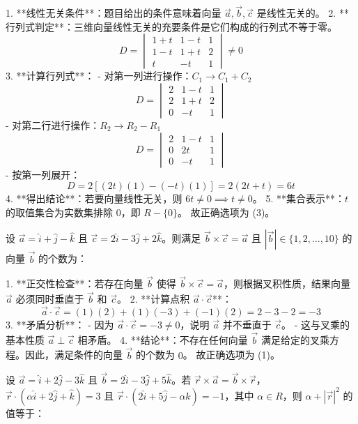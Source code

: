 \begin{questions}
\begin{solution}
1. **线性无关条件**：题目给出的条件意味着向量 $\vec{a}, \vec{b}, \vec{c}$ 是线性无关的。
2. **行列式判定**：三维向量线性无关的充要条件是它们构成的行列式不等于零。
\[
D = \begin{vmatrix} 1+t & 1-t & 1 \\ 1-t & 1+t & 2 \\ t & -t & 1 \end{vmatrix} \neq 0
\]
3. **计算行列式**：
   - 对第一列进行操作：$C_1 \to C_1 + C_2$
\[
D = \begin{vmatrix} 2 & 1-t & 1 \\ 2 & 1+t & 2 \\ 0 & -t & 1 \end{vmatrix}
\]
   - 对第二行进行操作：$R_2 \to R_2 - R_1$
\[
D = \begin{vmatrix} 2 & 1-t & 1 \\ 0 & 2t & 1 \\ 0 & -t & 1 \end{vmatrix}
\]
   - 按第一列展开：
\[
D = 2 [ (2t)(1) - (-t)(1) ] = 2(2t + t) = 6t
\]
4. **得出结论**：若要向量线性无关，则 $6t \neq 0 \implies t \neq 0$。
5. **集合表示**：$t$ 的取值集合为实数集排除 $0$，即 $R - \{0\}$。
故正确选项为 (3)。
\end{solution}

\question
设 $\vec{a} = \hat{i} + \hat{j} - \hat{k}$ 且 $\vec{c} = 2\hat{i} - 3\hat{j} + 2\hat{k}$。则满足 $\vec{b} \times \vec{c} = \vec{a}$ 且 $|\vec{b}| \in \{1, 2, \dots, 10\}$ 的向量 $\vec{b}$ 的个数为：

\begin{solution}
1. **正交性检查**：若存在向量 $\vec{b}$ 使得 $\vec{b} \times \vec{c} = \vec{a}$，则根据叉积性质，结果向量 $\vec{a}$ 必须同时垂直于 $\vec{b}$ 和 $\vec{c}$。
2. **计算点积 $\vec{a} \cdot \vec{c}$**：
\[
\vec{a} \cdot \vec{c} = (1)(2) + (1)(-3) + (-1)(2) = 2 - 3 - 2 = -3
\]
3. **矛盾分析**：
   - 因为 $\vec{a} \cdot \vec{c} = -3 \neq 0$，说明 $\vec{a}$ 并不垂直于 $\vec{c}$。
   - 这与叉乘的基本性质 $\vec{a} \perp \vec{c}$ 相矛盾。
4. **结论**：不存在任何向量 $\vec{b}$ 满足给定的叉乘方程。因此，满足条件的向量 $\vec{b}$ 的个数为 $0$。
故正确选项为 (1)。
\end{solution}

\question
设 $\vec{a} = \hat{i} + 2\hat{j} - 3\hat{k}$ 且 $\vec{b} = 2\hat{i} - 3\hat{j} + 5\hat{k}$。若 $\vec{r} \times \vec{a} = \vec{b} \times \vec{r}$，$\vec{r} \cdot (\alpha\hat{i} + 2\hat{j} + \hat{k}) = 3$ 且 $\vec{r} \cdot (2\hat{i} + 5\hat{j} - \alpha\hat{k}) = -1$，其中 $\alpha \in R$，则 $\alpha + |\vec{r}|^2$ 的值等于：


\end{questions}
